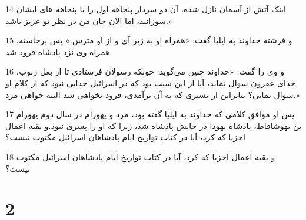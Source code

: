 \par 14 اینک آتش از آسمان نازل شده، آن دو سردار پنجاهه اول را با پنجاهه های ایشان سوزانید، اما الان جان من در نظر تو عزیز باشد.»
\par 15 و فرشته خداوند به ایلیا گفت: «همراه او به زیر آی و از او مترس.» پس برخاسته، همراه وی نزد پادشاه فرود شد.
\par 16 و وی را گفت: «خداوند چنین می‌گوید: چونکه رسولان فرستادی تا از بعل زبوب، خدای عقرون سوال نماید، آیا از این سبب بود که در اسرائیل خدایی نبود که از کلام او سوال نمایی؟ بنابراین از بستری که به آن برآمدی، فرود نخواهی شد البته خواهی مرد.»
\par 17 پس او موافق کلامی که خداوند به ایلیا گفته بود، مرد و یهورام در سال دوم یهورام بن یهوشافاط، پادشاه یهودا در جایش پادشاه شد، زیرا که او را پسری نبود.و بقیه اعمال اخزیا که کرد، آیا در کتاب تواریخ ایام پادشاهان اسرائیل مکتوب نیست؟
\par 18 و بقیه اعمال اخزیا که کرد، آیا در کتاب تواریخ ایام پادشاهان اسرائیل مکتوب نیست؟
 
\chapter{2}

